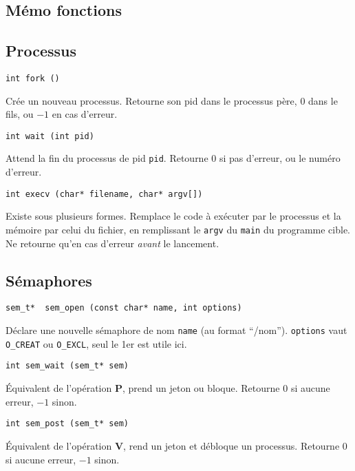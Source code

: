 \documentclass[a4paper]{article}
\begin{document}
\begin{multicols*}{2}
    \section{Mémo fonctions}

    \subsection{Processus}

    \begin{lstlisting}
int fork ()
    \end{lstlisting}

    Cr\'ee un nouveau processus.
    Retourne son pid dans le processus p\`ere, $0$ dans le fils, ou $-1$ en cas d'erreur.

    \begin{lstlisting}
int wait (int pid)
    \end{lstlisting}

    Attend la fin du processus de pid \texttt{pid}.
    Retourne 0 si pas d'erreur, ou le num\'ero d'erreur.

    \begin{lstlisting}
int execv (char* filename, char* argv[])
    \end{lstlisting}

    Existe sous plusieurs formes.
    Remplace le code à exécuter par le processus et la mémoire par celui du fichier, en remplissant le \texttt{argv} du \texttt{main} du programme cible.
    Ne retourne qu'en cas d'erreur \emph{avant} le lancement.

    \subsection{Sémaphores}

    \begin{lstlisting}
sem_t*  sem_open (const char* name, int options)
    \end{lstlisting}
    Déclare une nouvelle sémaphore de nom \texttt{name} (au format ``/nom''). 
    \texttt{options} vaut \texttt{O\_CREAT} ou \texttt{O\_EXCL}, seul le 1er est utile ici.


    \begin{lstlisting}
int sem_wait (sem_t* sem)
    \end{lstlisting}
    \'Equivalent de l'opération \textbf{P}, prend un jeton ou bloque.
    Retourne $0$ si aucune erreur, $-1$ sinon.


    \begin{lstlisting}
int sem_post (sem_t* sem)
    \end{lstlisting}
    \'Equivalent de l'opération \textbf{V}, rend un jeton et débloque un processus.
    Retourne $0$ si aucune erreur, $-1$ sinon.


\end{multicols*}
\end{document}
